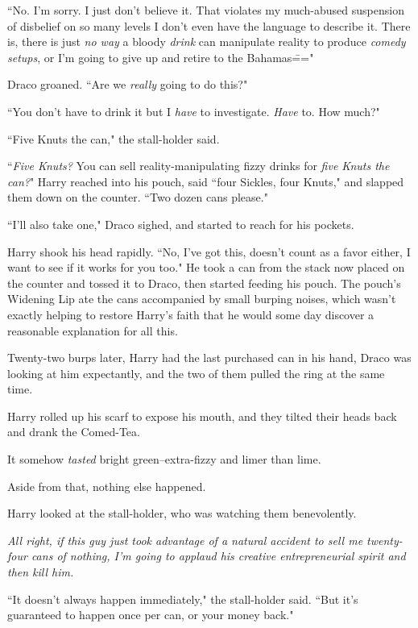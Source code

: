 ``No. I'm sorry. I just don't believe it. That violates my much-abused suspension of disbelief on so many levels I don't even have the language to describe it. There is, there is just \emph{no way} a bloody \emph{drink} can manipulate reality to produce \emph{comedy setups}, or I'm going to give up and retire to the Bahamas\==="

Draco groaned. ``Are we \emph{really} going to do this?"

``You don't have to drink it but I \emph{have} to investigate. \emph{Have} to. How much?"

``Five Knuts the can," the stall-holder said.

``\emph{Five Knuts?} You can sell reality-manipulating fizzy drinks for \emph{five Knuts the can?}" Harry reached into his pouch, said ``four Sickles, four Knuts," and slapped them down on the counter. ``Two dozen cans please."

``I'll also take one," Draco sighed, and started to reach for his pockets.

Harry shook his head rapidly. ``No, I've got this, doesn't count as a favor either, I want to see if it works for you too." He took a can from the stack now placed on the counter and tossed it to Draco, then started feeding his pouch. The pouch's Widening Lip ate the cans accompanied by small burping noises, which wasn't exactly helping to restore Harry's faith that he would some day discover a reasonable explanation for all this.

Twenty-two burps later, Harry had the last purchased can in his hand, Draco was looking at him expectantly, and the two of them pulled the ring at the same time.

Harry rolled up his scarf to expose his mouth, and they tilted their heads back and drank the Comed-Tea.

It somehow \emph{tasted} bright green\---extra-fizzy and limer than lime.

Aside from that, nothing else happened.

Harry looked at the stall-holder, who was watching them benevolently.

\emph{All right, if this guy just took advantage of a natural accident to sell me twenty-four cans of nothing, I'm going to applaud his creative entrepreneurial spirit and then kill him.}

``It doesn't always happen immediately," the stall-holder said. ``But it's guaranteed to happen once per can, or your money back."

